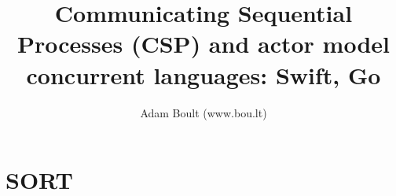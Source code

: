 \documentclass[oneside]{book}
\begin{document}
\author{Adam Boult (www.bou.lt)}
\title{Communicating Sequential Processes (CSP) and actor model concurrent languages: Swift, Go}
\maketitle

\setcounter{tocdepth}{0}
\tableofcontents



\part{SORT}

\end{document}
